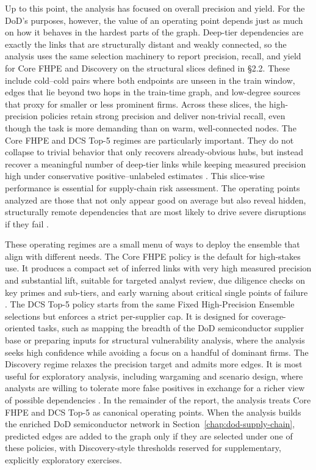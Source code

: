 Up to this point, the analysis has focused on overall precision and yield. For the DoD's purposes, however, the value of an operating point depends just as much on how it behaves in the hardest parts of the graph. Deep-tier dependencies are exactly the links that are structurally distant and weakly connected, so the analysis uses the same selection machinery to report precision, recall, and yield for Core FHPE and Discovery on the structural slices defined in \S2.2. These include cold--cold pairs where both endpoints are unseen in the train window, edges that lie beyond two hops in the train-time graph, and low-degree sources that proxy for smaller or less prominent firms. Across these slices, the high-precision policies retain strong precision and deliver non-trivial recall, even though the task is more demanding than on warm, well-connected nodes. The Core FHPE and DCS Top-5 regimes are particularly important. They do not collapse to trivial behavior that only recovers already-obvious hubs, but instead recover a meaningful number of deep-tier links while keeping measured precision high under conservative positive--unlabeled estimates \parencite{elkan_learning_2008,du_plessis_analysis_2014}. This slice-wise performance is essential for supply-chain risk assessment. The operating points analyzed are those that not only appear good on average but also reveal hidden, structurally remote dependencies that are most likely to drive severe disruptions if they fail \parencite{craighead_severity_2007,pettit_ensuring_2013}.

These operating regimes are a small menu of ways to deploy the ensemble that align with different needs. The Core FHPE policy is the default for high-stakes use. It produces a compact set of inferred links with very high measured precision and substantial lift, suitable for targeted analyst review, due diligence checks on key primes and sub-tiers, and early warning about critical single points of failure \parencite{hand_measuring_2009,craighead_severity_2007,pettit_ensuring_2013}. The DCS Top-5 policy starts from the same Fixed High-Precision Ensemble selections but enforces a strict per-supplier cap. It is designed for coverage-oriented tasks, such as mapping the breadth of the DoD semiconductor supplier base or preparing inputs for structural vulnerability analysis, where the analysis seeks high confidence while avoiding a focus on a handful of dominant firms. The Discovery regime relaxes the precision target and admits more edges. It is most useful for exploratory analysis, including wargaming and scenario design, where analysts are willing to tolerate more false positives in exchange for a richer view of possible dependencies \parencite{hand_measuring_2009,kamar_directions_2016,amershi_guidelines_2019}. In the remainder of the report, the analysis treats Core FHPE and DCS Top-5 as canonical operating points. When the analysis builds the enriched DoD semiconductor network in Section~\ref{chap:dod-supply-chain}, predicted edges are added to the graph only if they are selected under one of these policies, with Discovery-style thresholds reserved for supplementary, explicitly exploratory exercises.

